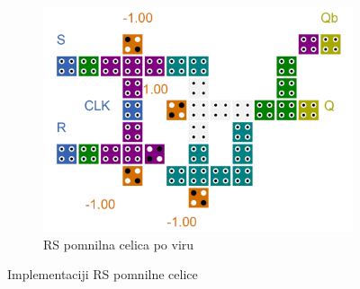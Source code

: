 \documentclass[a4paper, 11pt]{article}
\begin{document}
\begin{figure}[h!]
\begin{subfigure}[b]{0.5\textwidth}
	\includegraphics[width=\textwidth]{../img/vir_5/rs.png} 
	\caption{RS pomnilna celica po viru \cite{a_novel_approach}}
	\label{fig-rs-2}
	\end{subfigure}
	\caption{Implementaciji RS pomnilne celice}
	\label{fig-rs}
\end{figure}
\end{document}
